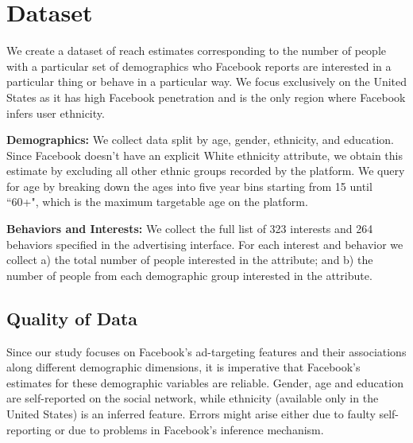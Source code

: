 \section{Dataset} \label{subsec:data_collected}
We create a dataset of reach estimates corresponding to the number of people with a particular set of demographics who Facebook reports are interested in a particular thing or behave in a particular way. We focus exclusively on the United States as it has high Facebook penetration and is the only region where Facebook infers user ethnicity.



\textbf{Demographics:} We collect data split by age, gender, ethnicity, and education. Since Facebook doesn't have an explicit White ethnicity attribute, we obtain this estimate by excluding all other ethnic groups recorded by the platform. We query for age by breaking down the ages into five year bins starting from 15 until ``60+", which is the maximum targetable age on the platform.

\textbf{Behaviors and Interests:} We collect the full list of 323 interests and 264 behaviors specified in the advertising interface. For each interest and behavior we collect a) the total number of people interested in the attribute; and b) the number of people from each demographic group interested in the attribute.


\subsection{Quality of Data} \label{sec:fb_quality}
Since our study focuses on Facebook's ad-targeting features and their associations along different demographic dimensions, it is imperative that Facebook's estimates for these demographic variables are reliable. Gender, age and education are self-reported on the social network, while ethnicity (available only in the United States) is an inferred feature. Errors might arise either due to faulty self-reporting or due to problems in Facebook's inference mechanism.


